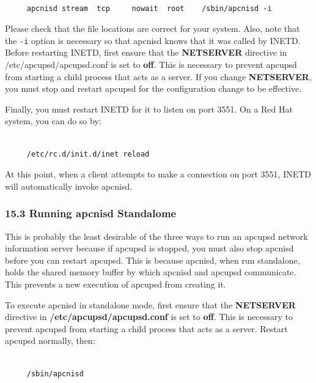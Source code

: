 \footnotesize
\begin{verbatim}
     
     apcnisd stream  tcp     nowait  root    /sbin/apcnisd -i
\end{verbatim}
\normalsize

Please check that the file locations are correct for your system. Also, note
that the {\tt -i} option is necessary so that apcnisd knows that it was called
by INETD. Before restarting INETD, first ensure that the {\bf NETSERVER}
directive in /etc/apcupsd/apcupsd.conf is set to {\bf off}. This is necessary
to prevent apcupsd from starting a child process that acts as a server. If you
change {\bf NETSERVER}, you must stop and restart apcupsd for the
configuration change to be effective.  

Finally, you must restart INETD for it to listen on port 3551. On a Red Hat
system, you can do so by: 

\footnotesize
\begin{verbatim}
     
     /etc/rc.d/init.d/inet reload
\end{verbatim}
\normalsize

At this point, when a client attempts to make a connection on port 3551, INETD
will automatically invoke apcnisd. 

\label{Running-apcnisd-Standalome}

\subsubsection*{15.3 Running apcnisd Standalome}

This is probably the least desirable of the three ways to run an apcupsd
network information server because if apcupsd is stopped, you must also stop
apcnisd before you can restart apcupsd. This is because apcnisd, when run
standalone, holds the shared memory buffer by which apcnisd and apcupsd
communicate. This prevents a new execution of apcupsd from creating it.  

To execute apcnisd in standalone mode, first ensure that the {\bf NETSERVER}
directive in {\bf /etc/apcupsd/apcupsd.conf} is set to {\bf off}. This is
necessary to prevent apcupsd from starting a child process that acts as a
server. Restart apcupsd normally, then: 

\footnotesize
\begin{verbatim}
     
     /sbin/apcnisd
\end{verbatim}
\normalsize

